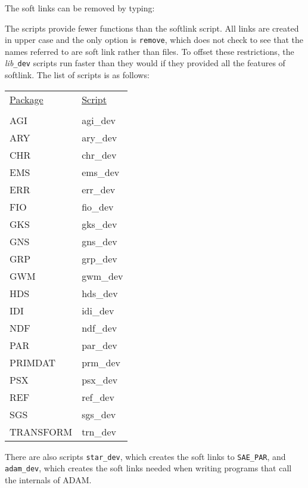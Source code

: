 \documentclass[11pt,nolof]{starlink}
\begin{document}
\begin{terminalv}
\end{terminalv}

The soft links can be removed by typing:

\begin{terminalv}
\end{terminalv}

The scripts provide fewer functions than the softlink script. All links are
created in upper case and the only option is \texttt{remove}, which does not check
to see that the names referred to are soft link rather than files. To offset
these restrictions, the \textit{lib}{\tt\_dev} scripts run faster than they would
if they provided all the features of softlink. The list of scripts is as
follows:

\begin{tabular}{ll}
\underline{Package} & \underline{Script} \\
& \\
AGI & agi\_dev \\
ARY & ary\_dev \\
CHR & chr\_dev \\
EMS & ems\_dev \\
ERR & err\_dev \\
FIO & fio\_dev \\
GKS & gks\_dev \\
GNS & gns\_dev \\
GRP & grp\_dev \\
GWM & gwm\_dev \\
HDS & hds\_dev \\
IDI & idi\_dev \\
NDF & ndf\_dev \\
PAR & par\_dev \\
PRIMDAT & prm\_dev \\
PSX & psx\_dev \\
REF & ref\_dev \\
SGS & sgs\_dev \\
TRANSFORM & trn\_dev
\end{tabular}

There are also scripts \texttt{star\_dev}, which creates the soft links to \texttt{SAE\_PAR}, and \texttt{adam\_dev}, which creates the soft links needed when
writing programs that call the internals of ADAM.
\end{document}
